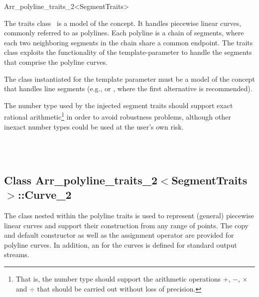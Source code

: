 
\ccRefPageBegin
\begin{ccRefClass}{Arr_polyline_traits_2<SegmentTraits>}

\ccDefinition

The traits class \ccRefName\ is a model of the 
concept. It handles piecewise linear curves, commonly referred to as
polylines. Each polyline is a chain of segments, where each two neighboring
segments in the chain share a common endpoint. The traits class exploits the
functionality of the  template-parameter to handle the
segments that comprise the polyline curves.

The class instantiated for the template parameter  must
be a model of the  concept that handles line
segments (e.g.,  or 
, where the first
alternative is recommended).

The number type used by the injected segment traits should support exact
rational arithmetic\footnote{That is, the number type should support
the arithmetic operations $+$, $-$, $\times$ and $\div$ that should be
carried out without loss of precision.} in order to avoid robustness
problems, although other inexact number types could be used at the user's
own risk.


\ccIsModel
  \\
  \\

\subsection*{Class Arr\_polyline\_traits\_2$<$SegmentTraits$>$::Curve\_2}

The  class nested within the polyline traits is used to
represent (general) piecewise linear curves and support their construction
from any range of points. The copy and default constructor as well as 
the assignment operator are provided for polyline curves. In addition, 
an  for the curves is defined for standard output streams.


\end{ccRefClass}
